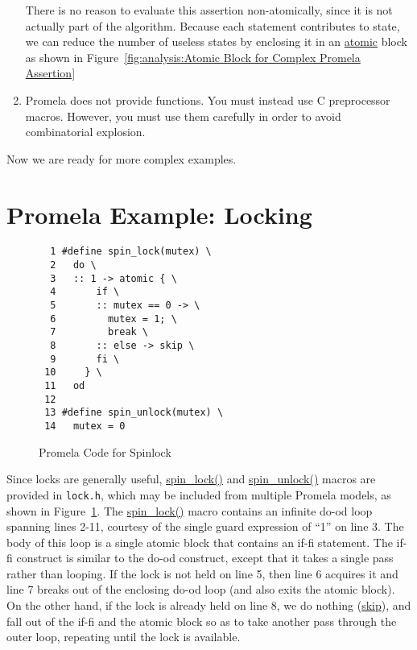 \begin{enumerate}
	There is no reason to evaluate this assertion
	non-atomically, since it is not actually part of the algorithm.
	Because each statement contributes to state, we can reduce
	the number of useless states by enclosing it in an \url{atomic}
	block as shown in
	Figure~\ref{fig:analysis:Atomic Block for Complex Promela Assertion}

\item	Promela does not provide functions.
	You must instead use C preprocessor macros.
	However, you must use them carefully in order to avoid
	combinatorial explosion.
\end{enumerate}

Now we are ready for more complex examples.

\section{Promela Example: Locking}
\label{app:formal:Promela Example: Locking}

\begin{figure}[tbp]
{ %
\begin{verbatim}
  1 #define spin_lock(mutex) \
  2   do \
  3   :: 1 -> atomic { \
  4       if \
  5       :: mutex == 0 -> \
  6         mutex = 1; \
  7         break \
  8       :: else -> skip \
  9       fi \
 10     } \
 11   od
 12 
 13 #define spin_unlock(mutex) \
 14   mutex = 0
\end{verbatim}
}
\caption{Promela Code for Spinlock}
\label{fig:analysis:Promela Code for Spinlock}
\end{figure}

Since locks are generally useful, \url{spin_lock()} and
\url{spin_unlock()}
macros are provided in {\tt lock.h}, which may be included from
multiple Promela models, as shown in
Figure~\ref{fig:analysis:Promela Code for Spinlock}.
The \url{spin_lock()} macro contains an infinite do-od loop
spanning lines 2-11,
courtesy of the single guard expression of ``1'' on line 3.
The body of this loop is a single atomic block that contains
an if-fi statement.
The if-fi construct is similar to the do-od construct, except
that it takes a single pass rather than looping.
If the lock is not held on line 5, then line 6 acquires it and
line 7 breaks out of the enclosing do-od loop (and also exits
the atomic block).
On the other hand, if the lock is already held on line 8,
we do nothing (\url{skip}), and fall out of the if-fi and the
atomic block so as to take another pass through the outer
loop, repeating until the lock is available.

